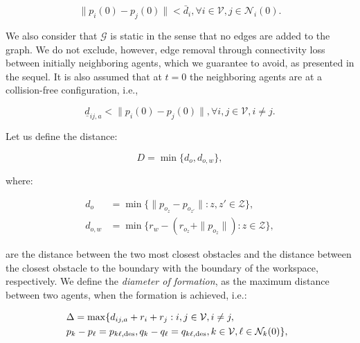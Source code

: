 \begin{equation} \label{eq:initially_connected}
\| p_i(0)-p_j(0) \| < \bar{d}_{i}, \forall i \in \mathcal{V}, j \in \mathcal{N}_i(0).
\end{equation}

We also consider that $\mathcal{G}$ is static in the sense that no edges are
added to the graph. We do not exclude, however, edge removal through
connectivity loss between initially neighboring agents, which we guarantee
to avoid, as presented in the sequel. It is also assumed that at $t=0$ the
neighboring agents are at a collision-free configuration, i.e.,

\begin{equation} \label{eq:initially_coll_free}
\underline{d}_{ij, a} < \| p_i(0)-p_j(0)\|, \forall i,j \in \mathcal{V}, i \neq j.
\end{equation}

Let us define the distance:

\begin{equation*}
D = \min\{d_o, d_{o,w}\},
\end{equation*}

where:

\begin{align*}
d_o &= \min\{\| p_{o_z} - p_{o_{z'}}\| : z,z' \in \mathcal{Z} \}, \\
d_{o,w} &= \min\{r_w - \left( r_{o_z} + \| p_{o_z} \| \right) : z \in \mathcal{Z}\},
\end{align*}

are the distance between the two most closest obstacles and the distance between
the closest obstacle to the boundary with the boundary of the workspace,
respectively. We define the \emph{diameter of formation}, as the maximum
distance between two agents, when the formation is achieved, i.e.:

\begin{align*}
&\hspace{-2mm} \Delta =  \max\{d_{ij, a}+r_i+r_j: i, j \in \mathcal{V}, i \neq j, \notag \\
&\hspace{-2mm} p_k - p_\ell = p_{k \ell,\text{des}}, q_k-q_\ell = q_{k \ell,\text{des}}, k \in \mathcal{V}, \ell \in \mathcal{N}_k(0)\},
\end{align*}


